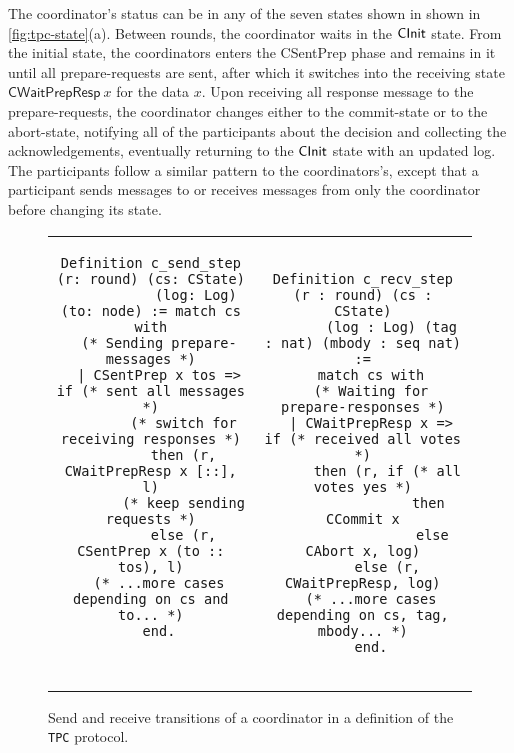 The coordinator's status can be in any of the seven states shown in
shown in \cref{fig:tpc-state}(a).
%
Between rounds, the coordinator waits in the $\mathsf{CInit}$ state.
%
From the initial state, the coordinators enters the \textsf{CSentPrep}
phase and remains in it until all prepare-requests are sent, after
which it switches into the receiving state $\mathsf{CWaitPrepResp}~x$
for the data $x$.
%
Upon receiving all response message to the prepare-requests, the
coordinator changes either to the commit-state or to the abort-state,
notifying all of the participants about the decision and collecting
the acknowledgements, eventually returning to the $\mathsf{CInit}$ state with
an updated log.
%
The participants follow a similar pattern to the coordinators's,
except that a participant sends messages to or receives messages
from only the coordinator before changing its state.

{
\begin{figure}[t!]
\setlength{\belowcaptionskip}{-10pt}
{\centering
\begin{tabular}{c@{\ }c}
\begin{minipage}{0.5\linewidth}
\begin{lstlisting}[style=Coq, basicstyle=\scriptsize\ttfamily]
Definition c_send_step (r: round) (cs: CState)
           (log: Log) (to: node) := match cs with
  (* Sending prepare-messages *)
  | CSentPrep x tos => if (* sent all messages *)
        (* switch for receiving responses *)
        then (r, CWaitPrepResp x [::], l)
        (* keep sending requests *)
        else (r, CSentPrep x (to :: tos), l)
  (* ...more cases depending on cs and to... *)
  end.



\end{lstlisting}
\end{minipage}
&
\begin{minipage}{0.5\linewidth}
\begin{lstlisting}[style=Coq, basicstyle=\scriptsize\ttfamily]
Definition c_recv_step (r : round) (cs : CState)
       (log : Log) (tag : nat) (mbody : seq nat) :=
  match cs with
  (* Waiting for prepare-responses *)
  | CWaitPrepResp x => if (* received all votes *)
      then (r, if (* all votes yes *)
                then CCommit x
	             else CAbort x, log)
      else (r, CWaitPrepResp, log)
  (* ...more cases depending on cs, tag, mbody... *)
  end.
\end{lstlisting}
\vspace{-8pt}
\end{minipage}
\end{tabular}
}
\caption{Send and receive transitions of a coordinator in a \disel
  definition of the {\small\texttt{{TPC}}} protocol.}
\label{fig:coordinator-trans}
\end{figure}
}

